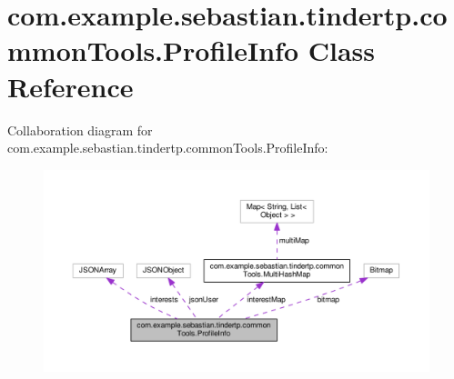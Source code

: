 \hypertarget{classcom_1_1example_1_1sebastian_1_1tindertp_1_1commonTools_1_1ProfileInfo}{}\section{com.\+example.\+sebastian.\+tindertp.\+common\+Tools.\+Profile\+Info Class Reference}
\label{classcom_1_1example_1_1sebastian_1_1tindertp_1_1commonTools_1_1ProfileInfo}


Collaboration diagram for com.\+example.\+sebastian.\+tindertp.\+common\+Tools.\+Profile\+Info\+:\nopagebreak
\begin{figure}[H]
\begin{center}
\leavevmode
\includegraphics[width=350pt]{classcom_1_1example_1_1sebastian_1_1tindertp_1_1commonTools_1_1ProfileInfo__coll__graph}
\end{center}
\end{figure}
